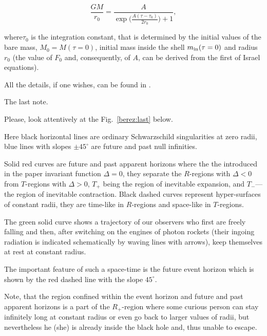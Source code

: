  \begin{equation}

 \label{solM}

 \frac{GM}{r_0} = \frac{A}{\exp\bigl({\frac{A(\tau - \tau_0)}{2r_0}}\bigr) + 1} ,

 \end{equation}

  where$\tau_0$ is the integration constant, that is determined by the initial values of the bare mass, $M_0= M(\tau = 0)$, initial mass inside the shell $m_{\rm in}(\tau = 0)$ and radius $r_0$  (the value of $F_0$ and, consequently, of $A$, can be derived from the first of Israel equations).



All the details, if one wishes, can be found in \cite{berez:Berobs}. 

The last note. 

Please, look attentively at the Fig.~\ref{berez:last} below.

Here black horizontal lines are ordinary Schwarzschild singularities at zero radii, blue lines with slopes $\pm 45^{\circ}$ are future and past null infinities. 

Solid red curves are future and past apparent horizons where the the introduced in the paper invariant function $\Delta = 0$, they separate the $R$-regions with $\Delta < 0$ from $T$-regions with $\Delta > 0$, $T_+$ being the region of inevitable expansion, and $T_-$---the region of inevitable contraction. Black dashed curves represent hyper-surfaces of constant radii, they are time-like in $R$-regions and space-like in $T$-regions. 

The green solid curve shows a trajectory of our observers who first are freely falling and then, after switching on the engines of photon rockets (their ingoing radiation is indicated schematically by waving lines with arrows), keep themselves at rest at constant radius. 

The important feature of such a space-time is the future event horizon which is shown by the red dashed line with the slope $45^{\circ}$. 

Note, that the region confined within the event horizon and future and past apparent horizons is a part of the $R_+$-region where some curious person can stay infinitely long at constant radius or even go back to larger values of radii, but nevertheless he (she) is already inside the black hole and, thus unable to escape.









